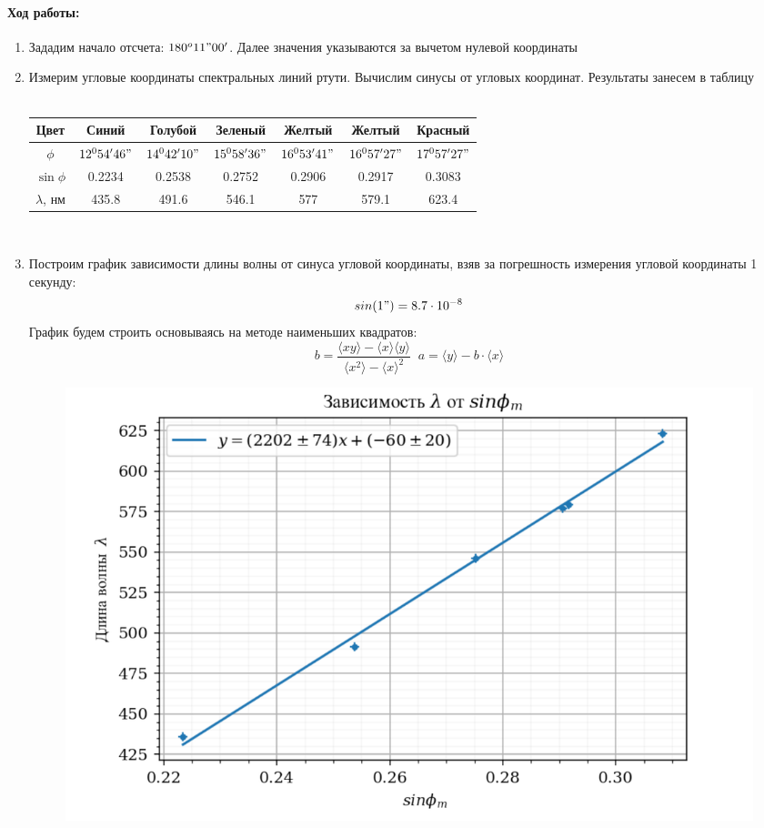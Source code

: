 \documentclass[a4paper,12pt]{article}
\begin{document}
\paragraph{Ход работы:}
\begin{enumerate}
\itemsep0em
\item Зададим начало отсчета: $180^o11"00'$. Далее значения указываются за вычетом нулевой координаты
\item Измерим угловые координаты спектральных линий ртути. Вычислим синусы от угловых координат. Результаты занесем в таблицу\\
\\
\begin{tabular}{|c|c|c|c|c|c|c|}
\hline 
Цвет & Синий & Голубой & Зеленый & Желтый & Желтый & Красный \\ 
\hline 
$\phi$ & $12^054'46"$ & $14^042'10"$ & $15^058'36"$ & $16^053'41"$ & $16^057'27"$ & $17^057'27"$ \\ 
\hline 
$\sin\phi$ & 0.2234 & 0.2538 & 0.2752 & 0.2906 & 0.2917 & 0.3083 \\ 
\hline 
$\lambda$, нм & 435.8 & 491.6 & 546.1 & 577 & 579.1 & 623.4 \\ 
\hline 
\end{tabular}\\ 
\item Построим график зависимости длины волны от синуса угловой координаты, взяв за погрешность измерения угловой координаты 1 секунду:
$$sin(1") = 8.7\cdot10^{-8}$$
График будем строить основываясь на методе наименьших квадратов:
\begin{equation*}
b = \frac{\langle xy \rangle - \langle x \rangle \langle y \rangle}{\langle x^2 \rangle - \langle x \rangle^2} \;\;
a = \langle y \rangle - b \cdot \langle x \rangle
\label{mnk}
\end{equation*}
\begin{figure}[h!]
\centering
\includegraphics[scale=0.4]{plot.png} 

\end{figure}
\end{enumerate}
\end{document}
